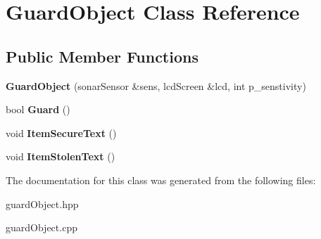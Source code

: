 \hypertarget{class_guard_object}{}\section{Guard\+Object Class Reference}
\label{class_guard_object}
\subsection*{Public Member Functions}
\begin{DoxyCompactItemize}
\item 
{\bfseries Guard\+Object} (sonar\+Sensor \&sens, lcd\+Screen \&lcd, int p\+\_\+senstivity)\hypertarget{class_guard_object_aa138048939cf253831b16909a97ef307}{}\label{class_guard_object_aa138048939cf253831b16909a97ef307}

\item 
bool {\bfseries Guard} ()\hypertarget{class_guard_object_ae21593809f1d77f92fd3bbc52f245bfc}{}\label{class_guard_object_ae21593809f1d77f92fd3bbc52f245bfc}

\item 
void {\bfseries Item\+Secure\+Text} ()\hypertarget{class_guard_object_aed3b5102376ab0ab9b40852d3d5cd104}{}\label{class_guard_object_aed3b5102376ab0ab9b40852d3d5cd104}

\item 
void {\bfseries Item\+Stolen\+Text} ()\hypertarget{class_guard_object_af49197b0cca7b1b437e4b714d765db9a}{}\label{class_guard_object_af49197b0cca7b1b437e4b714d765db9a}

\end{DoxyCompactItemize}


The documentation for this class was generated from the following files\+:\begin{DoxyCompactItemize}
\item 
guard\+Object.\+hpp\item 
guard\+Object.\+cpp\end{DoxyCompactItemize}
